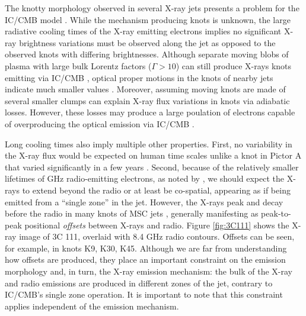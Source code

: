 The knotty morphology observed in several X-ray jets presents a problem for the IC/CMB model \citep[e.g.,][]{sambruna2004survey,jester2006new,Clautice:2016zai,siemiginowska2007300}. While the mechanism producing knots is unknown, the large radiative cooling times of the X-ray emitting electrons  \citep[$\geq 10^6$ years, e.g.,][]{harris2006x} implies no significant X-ray brightness variations must be observed along the jet as opposed to the observed knots with differing brightnesses. Although separate moving blobs of plasma with large bulk Lorentz factors ($\Gamma>10$) can still produce X-rays knots emitting via IC/CMB \citep{tavecchio2003clumps}, optical proper motions in the knots of nearby jets indicate much smaller values \citep[$\Gamma<2.9$ in 3C 273, e.g., ][]{meyer2016hst}. Moreover, assuming moving knots are made of several smaller clumps can  explain X-ray flux variations in knots via adiabatic losses. However, these losses may produce a large poulation of electrons capable of overproducing the optical emission via IC/CMB \citep{stawarz2004multiwavelength}.

Long cooling times also imply multiple other properties. First, no variability in the X-ray flux would be expected on human time scales unlike a knot in Pictor A that varied significantly in a few years \citep{marshall2010flare}. Second, because of the relatively smaller lifetimes of GHz radio-emitting electrons, as noted by \citet{worrall2009x}, we should expect the X-rays to extend beyond the radio or at least be co-spatial, appearing as if being emitted from a ``single zone'' in the jet. However, the X-rays peak and decay before the radio in many knots of MSC jets \citep[e.g.,][]{2005MNRAS.360..926W,siemiginowska2007300,kataoka2008chandra,worrall2009x,Clautice:2016zai}, generally manifesting as peak-to-peak positional \textit{offsets} between X-rays and radio. Figure \ref{fig:3C111} shows the X-ray image of 3C 111, overlaid with 8.4 GHz radio contours. Offsets can be seen, for example, in knots K9, K30, K45. Although we are far from understanding how offsets are produced, they place an important constraint on the emission morphology and, in turn, the X-ray emission mechanism: the bulk of the X-ray and radio emissions are produced in different zones of the jet, contrary to IC/CMB's single zone operation. It is important to note that this constraint applies independent of the emission mechanism.

